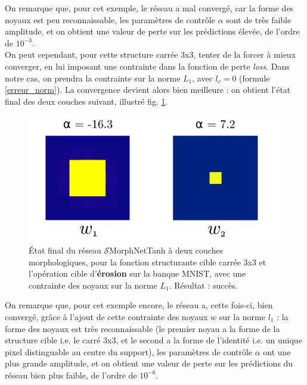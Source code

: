 \vspace{-0.4mm}
On remarque que, pour cet exemple, le réseau a mal convergé, car la forme des noyaux est peu reconnaissable, les paramètres de contrôle $\alpha$ sont de très faible amplitude, et on obtient une valeur de perte sur les prédictions élevée, de l'ordre de $10^{-3}$. \\

\vspace{-1.0mm}
\noindent On peut cependant, pour cette structure carrée 3x3, tenter de la forcer à mieux converger, en lui imposant une contrainte dans la fonction de perte \textit{loss}. Dans notre cas, on prendra la contrainte sur la norme $L_1$, avec $l_c = 0$ (formule \ref{erreur_norm}). La convergence devient alors bien meilleure : on obtient l'état final des deux couches suivant, illustré fig. \ref{fig:square_success}.


\newpage

\begin{figure}[!htp]
  \begin{center}
    \includegraphics[width=0.36\linewidth]{parts/4-analyse_des_reseaux/deux_couches_pour_OPfondamentale/figures/square_success.pdf}
    \vspace{1.0mm}
    \caption{ \centering État final du réseau $\mathcal{S}$MorphNetTanh à deux couches morphologiques, pour la fonction structurante cible carrée 3x3 et l'opération cible d'\textbf{érosion} sur la banque MNIST, avec une contrainte des noyaux sur la norme $L_1$. Résultat : succès.}
    \label{fig:square_success}
  \end{center}
\end{figure}

\vspace{-0.2mm}
On remarque que, pour cet exemple encore, le réseau a, cette fois-ci, bien convergé, grâce à l'ajout de cette contrainte des noyaux $w$ sur la norme $l_1$ : la forme des noyaux est très reconnaissable (le premier noyau a la forme de la structure cible i.e. le carré 3x3, et le second a la forme de l'identité i.e. un unique pixel distinguable au centre du support), les paramètres de contrôle $\alpha$ ont une plus grande amplitude, et on obtient une valeur de perte sur les prédictions du réseau bien plus faible, de l'ordre de $10^{-6}$. \\

